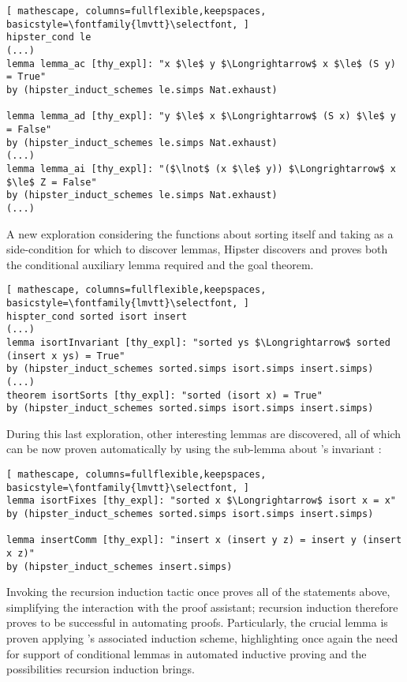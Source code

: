 \begin{lstlisting}[ mathescape, columns=fullflexible,keepspaces, basicstyle=\fontfamily{lmvtt}\selectfont, ]
hipster_cond le
(...)
lemma lemma_ac [thy_expl]: "x $\le$ y $\Longrightarrow$ x $\le$ (S y) = True"
by (hipster_induct_schemes le.simps Nat.exhaust)

lemma lemma_ad [thy_expl]: "y $\le$ x $\Longrightarrow$ (S x) $\le$ y = False"
by (hipster_induct_schemes le.simps Nat.exhaust)
(...)
lemma lemma_ai [thy_expl]: "($\lnot$ (x $\le$ y)) $\Longrightarrow$ x $\le$ Z = False"
by (hipster_induct_schemes le.simps Nat.exhaust)
(...)
\end{lstlisting}

A new exploration considering the functions about sorting itself and taking  as a side-condition for which to discover lemmas, Hipster discovers and proves both the conditional auxiliary lemma required and the goal theorem.

\begin{lstlisting}[ mathescape, columns=fullflexible,keepspaces, basicstyle=\fontfamily{lmvtt}\selectfont, ]
hispter_cond sorted isort insert
(...)
lemma isortInvariant [thy_expl]: "sorted ys $\Longrightarrow$ sorted (insert x ys) = True"
by (hipster_induct_schemes sorted.simps isort.simps insert.simps)
(...)
theorem isortSorts [thy_expl]: "sorted (isort x) = True"
by (hipster_induct_schemes sorted.simps isort.simps insert.simps)
\end{lstlisting}

During this last exploration, other interesting lemmas are discovered, all of which can be now proven automatically by using the sub-lemma about 's invariant :

\begin{lstlisting}[ mathescape, columns=fullflexible,keepspaces, basicstyle=\fontfamily{lmvtt}\selectfont, ]
lemma isortFixes [thy_expl]: "sorted x $\Longrightarrow$ isort x = x"
by (hipster_induct_schemes sorted.simps isort.simps insert.simps)

lemma insertComm [thy_expl]: "insert x (insert y z) = insert y (insert x z)"
by (hipster_induct_schemes insert.simps)
\end{lstlisting}

Invoking the recursion induction tactic  once proves all of the statements above, simplifying the interaction with the proof assistant; recursion induction therefore proves to be successful in automating proofs.
%
Particularly, the crucial lemma  is proven applying 's associated induction scheme, highlighting once again the need for support of conditional lemmas in automated inductive proving and the possibilities recursion induction brings.


